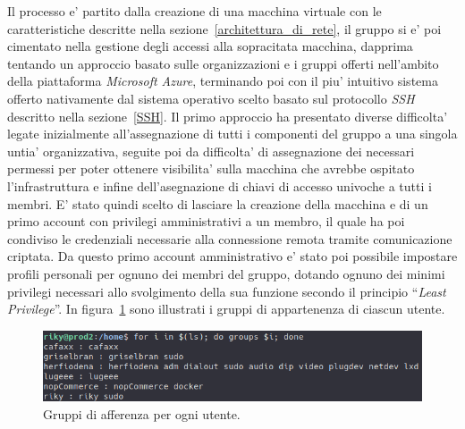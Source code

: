 \documentclass[a4paper]{report}
\newcommand{\quotes}[1]{``#1''}
\begin{document}
		Il processo e' partito dalla creazione di una macchina virtuale con le caratteristiche descritte nella
		sezione~\ref{architettura_di_rete}, il gruppo si e' poi cimentato nella gestione degli accessi alla sopracitata
		macchina, dapprima tentando un approccio basato sulle organizzazioni e i gruppi offerti nell'ambito della
		piattaforma \emph{Microsoft Azure}, terminando poi con il piu' intuitivo sistema offerto nativamente dal sistema
		operativo scelto basato sul protocollo \emph{SSH} descritto nella sezione~\ref{SSH}.
		Il primo approccio ha presentato diverse difficolta' legate inizialmente all'assegnazione di tutti i componenti
		del gruppo a una singola untia' organizzativa, seguite poi da difficolta' di assegnazione dei necessari permessi
		per poter ottenere visibilita' sulla macchina che avrebbe ospitato l'infrastruttura e infine dell'asegnazione di
		chiavi di accesso univoche a tutti i membri. E' stato quindi scelto di lasciare la creazione della macchina e di
		un primo account con privilegi amministrativi a un membro, il quale ha poi condiviso le credenziali necessarie
		alla connessione remota tramite comunicazione criptata. Da questo primo account amministrativo e' stato poi
		possibile impostare profili personali per ognuno dei membri del gruppo, dotando ognuno dei minimi privilegi
		necessari allo svolgimento della sua funzione secondo il principio \quotes{\emph{Least Privilege}}. In
		figura~\ref{fig:utenti_e_gruppi} sono illustrati i gruppi di appartenenza di ciascun utente.

		\begin{figure}[H]
			\includegraphics[width=\textwidth]{UtentiEGruppi.png}
			\caption{Gruppi di afferenza per ogni utente.}\label{fig:utenti_e_gruppi}
		\end{figure}
\end{document}
